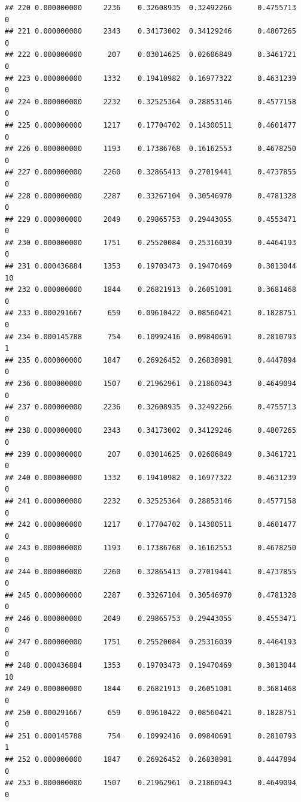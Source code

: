 \documentclass[
]{article}
\begin{document}
\begin{verbatim}
## 220 0.000000000     2236    0.32608935  0.32492266      0.4755713       0
## 221 0.000000000     2343    0.34173002  0.34129246      0.4807265       0
## 222 0.000000000      207    0.03014625  0.02606849      0.3461721       0
## 223 0.000000000     1332    0.19410982  0.16977322      0.4631239       0
## 224 0.000000000     2232    0.32525364  0.28853146      0.4577158       0
## 225 0.000000000     1217    0.17704702  0.14300511      0.4601477       0
## 226 0.000000000     1193    0.17386768  0.16162553      0.4678250       0
## 227 0.000000000     2260    0.32865413  0.27019441      0.4737855       0
## 228 0.000000000     2287    0.33267104  0.30546970      0.4781328       0
## 229 0.000000000     2049    0.29865753  0.29443055      0.4553471       0
## 230 0.000000000     1751    0.25520084  0.25316039      0.4464193       0
## 231 0.000436884     1353    0.19703473  0.19470469      0.3013044      10
## 232 0.000000000     1844    0.26821913  0.26051001      0.3681468       0
## 233 0.000291667      659    0.09610422  0.08560421      0.1828751       0
## 234 0.000145788      754    0.10992416  0.09840691      0.2810793       1
## 235 0.000000000     1847    0.26926452  0.26838981      0.4447894       0
## 236 0.000000000     1507    0.21962961  0.21860943      0.4649094       0
## 237 0.000000000     2236    0.32608935  0.32492266      0.4755713       0
## 238 0.000000000     2343    0.34173002  0.34129246      0.4807265       0
## 239 0.000000000      207    0.03014625  0.02606849      0.3461721       0
## 240 0.000000000     1332    0.19410982  0.16977322      0.4631239       0
## 241 0.000000000     2232    0.32525364  0.28853146      0.4577158       0
## 242 0.000000000     1217    0.17704702  0.14300511      0.4601477       0
## 243 0.000000000     1193    0.17386768  0.16162553      0.4678250       0
## 244 0.000000000     2260    0.32865413  0.27019441      0.4737855       0
## 245 0.000000000     2287    0.33267104  0.30546970      0.4781328       0
## 246 0.000000000     2049    0.29865753  0.29443055      0.4553471       0
## 247 0.000000000     1751    0.25520084  0.25316039      0.4464193       0
## 248 0.000436884     1353    0.19703473  0.19470469      0.3013044      10
## 249 0.000000000     1844    0.26821913  0.26051001      0.3681468       0
## 250 0.000291667      659    0.09610422  0.08560421      0.1828751       0
## 251 0.000145788      754    0.10992416  0.09840691      0.2810793       1
## 252 0.000000000     1847    0.26926452  0.26838981      0.4447894       0
## 253 0.000000000     1507    0.21962961  0.21860943      0.4649094       0

\end{verbatim}
\end{document}
